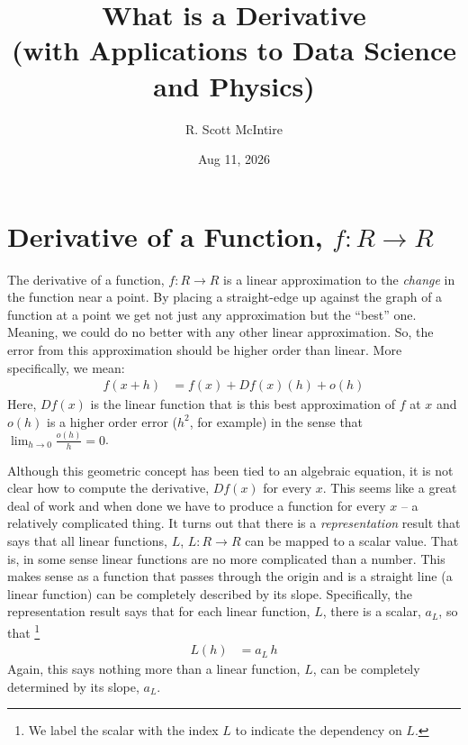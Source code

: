 \documentclass{article}
\title{What is a Derivative \\ (with Applications to Data Science and Physics)}
\author{R. Scott McIntire}
\date{Aug 11, 2026}
\begin{document}
\maketitle

\section{Derivative of a Function, $f: R\rightarrow R$}
The derivative of a function, $f : R \rightarrow R$ is a linear approximation to
the {\em change\/} in the function near a point. By placing a straight-edge up against the graph of a function at
a point we get not just any approximation but the ``best''{} one. Meaning,
we could do no better with any other linear approximation. So, the error
from this approximation should be higher order than linear. More specifically,
we mean:
\begin{align}
f(x + h) &= f(x) + Df(x)(h) + o(h) \label{simderdef}
\end{align}
Here, $Df(x)$ is the linear function that is this best approximation of $f$ at $x$
and $o(h)$ is a higher order error ($h^2$, for example) in the sense that
$\lim_{h\rightarrow 0} \frac{o(h)}{h} = 0$.

Although this geometric concept has been tied to an algebraic equation,
it is not clear how to compute the derivative, $Df(x)$ for every $x$. This seems
like a great deal of work and when done we have to produce a function for
every $x$ -- a relatively complicated thing. It turns out that there is a
{\em representation\/} result that says that all linear functions, $L$,
$L: R \rightarrow R$ can be mapped to a scalar value. That is, in some sense
linear functions are no more complicated than a number. This makes sense
as a function that passes through the origin and is a straight line (a linear function)
can be completely described by its slope.
Specifically, the representation result says that 
for each linear function, $L$, there is a scalar, $a_L$, so that%
\footnote{We label the scalar with the index $L$ to indicate the dependency on $L$.}
\begin{align}
  L(h) &= a_L \, h
\end{align}
Again, this says nothing more than a linear function, $L$, can be completely determined
by its slope, $a_L$.
\end{document}
